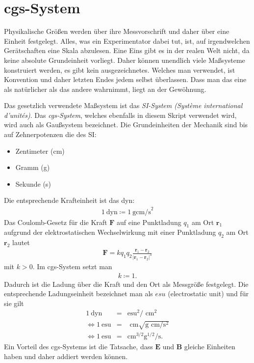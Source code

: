 \documentclass{book}
\begin{document}
\section{cgs-System}
\label{sec:cgssystem}

Physikalische Größen werden über ihre Messvorschrift und daher über eine Einheit festgelegt. Alles, was ein Experimentator dabei tut, ist, auf irgendwelchen Gerätschaften eine Skala abzulesen. Eine Eins gibt es in der realen Welt nicht, da keine absolute Grundeinheit vorliegt. Daher können unendlich viele Maßsysteme konstruiert werden, es gibt kein ausgezeichnetes. Welches man verwendet, ist Konvention und daher letzten Endes jedem selbst überlassen. Dass man das eine als natürlicher als das andere wahrnimmt, liegt an der Gewöhnung.

Das gesetzlich verwendete Maßsystem ist das \textit{SI-System (Système international d'unités)}. Das \textit{cgs-System}, welches ebenfalls in diesem Skript verwendet wird, wird auch als Gaußsystem bezeichnet. Die Grundeinheiten der Mechanik sind bis auf Zehnerpotenzen die des SI:
%
\begin{itemize}
\item Zentimeter (cm)
\item Gramm (g)
\item Sekunde (s)
\end{itemize}
%
Die entsprechende Krafteinheit ist das dyn:
%
\begin{eqnarray}
1\:\text{dyn} \coloneqq 1\:\text{gcm/s}^2
\end{eqnarray}
%
Das Coulomb-Gesetz für die Kraft $\mathbf{F}$ auf eine Punktladung $q_1$ am Ort $\mathbf{r}_1$ aufgrund der elektrostatischen Wechselwirkung mit einer Punktladung $q_2$ am Ort $\mathbf{r}_2$ lautet
%
\begin{eqnarray}
\mathbf{F} = kq_1q_2\frac{\mathbf{r}_1 - \mathbf{r}_2}{|\mathbf{r}_1 - \mathbf{r}_2|^3}
\end{eqnarray}
%
mit $k>0$. Im cgs-System setzt man
%
\begin{eqnarray}
k \coloneqq 1.
\end{eqnarray}
%
Dadurch ist die Ladung über die Kraft und den Ort als Messgröße festgelegt. Die entsprechende Ladungseinheit bezeichnet man als $esu$ (electrostatic unit) und für sie gilt
%
\begin{eqnarray}
1\:\text{dyn} & = & \text{esu}^2/\text{ cm}^2\nonumber\\
\Leftrightarrow 1\:\text{esu} & = & \text{ cm}\sqrt{\text{g cm}/\text{s}^2}\nonumber\\
\Leftrightarrow 1\:\text{esu} & = & \text{cm}^{3/2}\text{g}^{1/2}/\text{s}.
\end{eqnarray}
%
Ein Vorteil des cgs-Systems ist die Tatsache, dass $\mathbf{E}$ und $\mathbf{B}$ gleiche Einheiten haben und daher addiert werden können.
\end{document}
